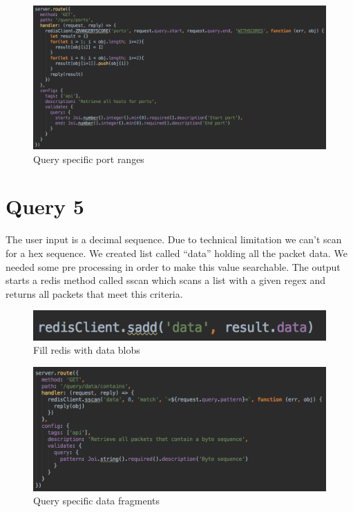 \begin{figure}[htb!]
	\centerline{\includegraphics[width=1.0\textwidth]{resources/solution2-9.png}}
	\caption{Query specific port ranges}
	\label{query44}
\end{figure}

\section{Query 5}
The user input is a decimal sequence. Due to technical limitation we can’t scan for a hex sequence. We created list called “data” holding all the packet data. We needed some pre processing in order to make this value searchable. The output starts a redis method called sscan which scans a list with a given regex and returns all packets that meet this criteria.

  \begin{figure}[htb!]
	\centerline{\includegraphics[width=1.0\textwidth]{resources/solution2-10.png}}
	\caption{Fill redis with data blobs}
	\label{query5}
\end{figure}

\begin{figure}[htb!]
	\centerline{\includegraphics[width=1.0\textwidth]{resources/solution2-11.png}}
	\caption{Query specific data fragments}
	\label{query55}
\end{figure}

